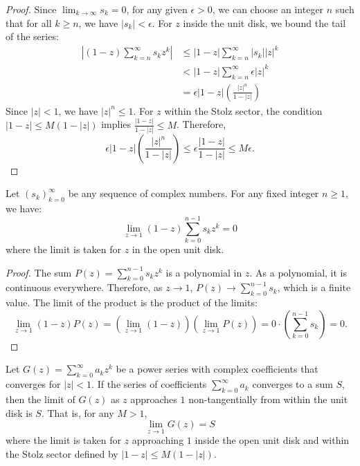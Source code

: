 \begin{proof}
Since $\lim_{k \to \infty} s_k = 0$, for any given $\epsilon > 0$, we can choose an integer $n$ such that for all $k \ge n$, we have $|s_k| < \epsilon$. For $z$ inside the unit disk, we bound the tail of the series:
\begin{align*}
\left| (1-z) \sum_{k=n}^{\infty} s_k z^k \right| & \le |1-z| \sum_{k=n}^{\infty} |s_k| |z|^k \\
& < |1-z| \sum_{k=n}^{\infty} \epsilon |z|^k \\
& = \epsilon |1-z| \left( \frac{|z|^n}{1 - |z|} \right)
\end{align*}
Since $|z| < 1$, we have $|z|^n \le 1$. For $z$ within the Stolz sector, the condition $|1-z| \le M(1-|z|)$ implies $\frac{|1-z|}{1-|z|} \le M$. Therefore,
$$\epsilon |1-z| \left( \frac{|z|^n}{1 - |z|} \right) \le \epsilon \frac{|1-z|}{1-|z|} \le M\epsilon.$$
\end{proof}

\begin{lemma}
Let $(s_k)_{k=0}^\infty$ be any sequence of complex numbers. For any fixed integer $n \ge 1$, we have:
$$\lim_{z \to 1} (1-z) \sum_{k=0}^{n-1} s_k z^k = 0$$
where the limit is taken for $z$ in the open unit disk.
\end{lemma}

\begin{proof}
The sum $P(z) = \sum_{k=0}^{n-1} s_k z^k$ is a polynomial in $z$. As a polynomial, it is continuous everywhere. Therefore, as $z \to 1$, $P(z) \to \sum_{k=0}^{n-1} s_k$, which is a finite value. The limit of the product is the product of the limits:
$$\lim_{z \to 1} (1-z) P(z) = \left(\lim_{z \to 1} (1-z)\right) \left(\lim_{z \to 1} P(z)\right) = 0 \cdot \left(\sum_{k=0}^{n-1} s_k\right) = 0.$$
\end{proof}

\begin{theorem}
Let $G(z) = \sum_{k=0}^{\infty} a_k z^k$ be a power series with complex coefficients that converges for $|z| < 1$. If the series of coefficients $\sum_{k=0}^{\infty} a_k$ converges to a sum $S$, then the limit of $G(z)$ as $z$ approaches $1$ non-tangentially from within the unit disk is $S$. That is, for any $M > 1$,
$$\lim_{z \to 1} G(z) = S$$
where the limit is taken for $z$ approaching $1$ inside the open unit disk and within the Stolz sector defined by $|1-z| \le M(1-|z|)$.
\end{theorem}

